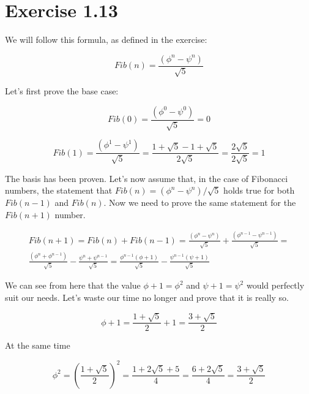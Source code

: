 \section*{Exercise 1.13}


	We will follow this formula, as defined in the exercise:

	\begin{equation}
		\label{fibonacci_approximation}
		Fib(n) = {\frac {\left(\phi^n-\psi^n \right)} {\sqrt5}}
	\end {equation}

	Let's first prove the base case:

	\begin{equation}
		Fib(0) = {\frac {\left(\phi^0-\psi^0 \right)} {\sqrt5}} = 0
	\end{equation}

	\begin{equation}
		Fib(1) = {\frac {\left(\phi^1-\psi^1 \right)} {\sqrt5}} = \frac {1 + \sqrt5 - 1 + \sqrt5} {2\sqrt5} = \frac {2\sqrt5} {2\sqrt5} = 1
	\end{equation}

The basis has been proven. Let's now assume that, in the case of Fibonacci numbers, the statement that $Fib(n) = \left(\phi^n-\psi^n\right)/\sqrt5$ holds true for both $Fib(n-1)$ and $Fib(n)$. Now we need to prove the same statement for the $Fib(n+1)$ number.

\begin{multline}
	Fib(n+1) = Fib(n) + Fib(n-1) = \frac {\left(\phi^n-\psi^n\right)} {\sqrt5} + \frac {\left(\phi^{n-1}-\psi^{n-1}\right)} {\sqrt5} = \\
	\frac {\left(\phi^n+\phi^{n-1}\right)} {\sqrt5} - \frac {\psi^n+\psi^{n-1}} {\sqrt5} = \frac {\phi^{n-1}\left(\phi+1\right)} {\sqrt5} - \frac {\psi^{n-1}\left(\psi+1\right)} {\sqrt5}
\end{multline}

We can see from here that the value $\phi+1=\phi^2$ and $\psi+1=\psi^2$ would perfectly suit our needs. Let's waste our time no longer and prove that it is really so.

\begin{equation}
	\phi+1 = \frac {1 + \sqrt5} {2} + 1 = \frac {3 + \sqrt5} {2}
\end{equation}

At the same time

\begin{equation}
	\phi^2 = \left(\frac {1 + \sqrt5} {2}\right)^2 = \frac {1 + 2\sqrt5 + 5} {4} = \frac {6 + 2\sqrt5} {4} = \frac {3 + \sqrt5} {2}
\end{equation}

